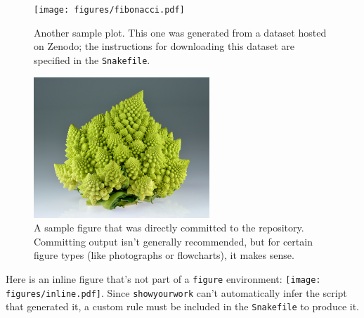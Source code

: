 \documentclass[twocolumn]{aastex631}
\begin{document}
\pagebreak

\begin{figure}[ht!]
    \begin{centering}
        \texttt{[image: figures/fibonacci.pdf]}
        \caption{
            Another sample plot.
            This one was generated from a dataset hosted on Zenodo; the instructions for downloading this dataset are specified in the \texttt{Snakefile}.
        }
        \label{fig:fibonacci}
    \end{centering}
\end{figure}

\begin{figure}[ht!]
    \begin{centering}
        \includegraphics[width=0.4\linewidth]{static/broccoli.pdf}
        \caption{
            A sample figure that was directly committed to the repository.
            Committing output isn't generally recommended, but for certain figure types (like photographs or flowcharts), it makes sense.
        }
        \label{fig:broccoli}
    \end{centering}
\end{figure}

Here is an inline figure that's not part of a \verb+figure+ environment: \texttt{[image: figures/inline.pdf]}. Since \texttt{showyourwork} can't automatically infer the script that generated it, a custom rule must be included in the \texttt{Snakefile} to produce it.

\vfill
\pagebreak

\end{document}
